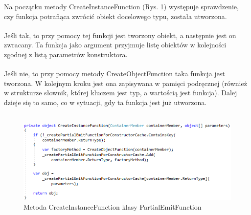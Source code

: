 \documentclass[12pt]{article}
\begin{document}
Na początku metody CreateInstanceFunction (Rys. \ref{fig:PartialEmitFunction_CreateInstanceFunction}) występuje sprawdzenie, czy funkcja potrafiąca zwrócić obiekt docelowego typu, została utworzona.\\
\\
Jeśli tak, to przy pomocy tej funkcji jest tworzony obiekt, a następnie jest on zwracany. Ta funkcja jako argument przyjmuje listę obiektów w kolejności zgodnej z listą parametrów konstruktora.\\
\\
Jeśli nie, to przy pomocy metody CreateObjectFunction taka funkcja jest tworzona. W kolejnym kroku jest ona zapisywana w pamięci podręcznej (również w strukturze słownik, której kluczem jest typ, a wartością jest funkcja). Dalej dzieje się to samo, co w sytuacji, gdy ta funkcja jest już utworzona.\\ \\
\begin{figure}[H]
	\begin{center}
  		\includegraphics{PartialEmitFunction_CreateInstanceFunction.png}
  		\caption{Metoda CreateInstanceFunction klasy PartialEmitFunction}
  		\label{fig:PartialEmitFunction_CreateInstanceFunction}
	\end{center}
\end{figure}
\end{document}
